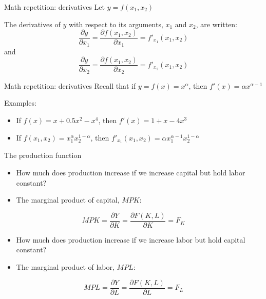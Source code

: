 \documentclass[10pt,handout]{beamer}
\begin{document}
\begin{frame}{Math repetition: derivatives}
    Let $y=f(x_1,x_2)$ \bigskip

    The derivatives of $y$ with respect to its arguments, $x_1$ and $x_2$, are written:
    \begin{equation*}
        \frac{\partial y}{\partial x_1}=\frac{\partial f(x_1,x_2)}{\partial x_1}=f'_{x_1}(x_1,x_2)
    \end{equation*}
    and
    \begin{equation*}
        \frac{\partial y}{\partial x_2}=\frac{\partial f(x_1,x_2)}{\partial x_2}=f'_{x_2}(x_1,x_2)
    \end{equation*}
\end{frame}


\begin{frame}{Math repetition: derivatives}
    Recall that if $y=f(x)=x^\alpha$, then $f'(x)=\alpha x^{\alpha-1}$ \bigskip

    Examples: 
    \begin{itemize}
        \item If $f(x)=x+0.5x^2-x^4 $, then $f'(x)=1+x-4x^3$
        \item If $f(x_1,x_2)=x_1^\alpha x_2^{1-\alpha}$, then $f'_{x_1}(x_1,x_2) = \alpha x_1^{\alpha-1} x_2^{1-\alpha}$
    \end{itemize}
\end{frame}


\begin{frame}{The production function}
\small{
    \begin{itemize}
        \item How much does production increase if we increase capital but hold labor constant?
        \item[] The marginal product of capital, $MPK$:
    \end{itemize}
    \[
    MPK = \frac{\partial Y}{\partial K} = \frac{\partial F(K,L)}{\partial K}= F_{K}
    \]
\bigskip

    \begin{itemize}
        \item How much does production increase if we increase labor but hold capital constant?
        \item[] The marginal product of labor, $MPL$:
    \end{itemize}
    \[
    MPL = \frac{\partial Y}{\partial L} = \frac{\partial F(K,L)}{\partial L}= F_{L}
    \]   
}
\end{frame}
\end{document}
